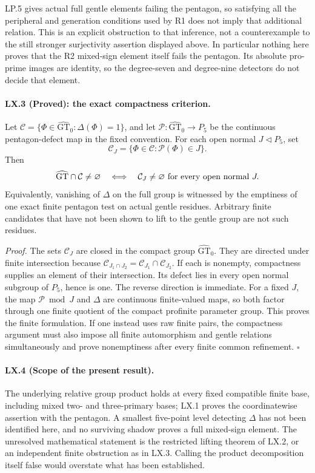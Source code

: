 LP.5 gives actual full gentle elements failing the pentagon,
so satisfying all the peripheral and generation conditions
used by R1 does not imply that additional relation. This is
an explicit obstruction to that inference, not a counterexample
to the still stronger surjectivity assertion displayed above.
In particular nothing here proves that the R2 mixed-sign
element itself fails the pentagon. Its absolute pro-prime
images are identity, so the degree-seven and degree-nine
detectors do not decide that element.

\paragraph{LX.3 (Proved): the exact compactness criterion.}
Let $\mathcal C=\{\Phi\in\widehat{\mathrm{GT}}_0:
\Delta(\Phi)=1\}$, and let
$\mathcal P:\widehat{\mathrm{GT}}_0\to P_5$ be the continuous
pentagon-defect map in the fixed convention. For each open
normal $J\triangleleft P_5$, set
\[
 \mathcal C_J=
 \{\Phi\in\mathcal C:\mathcal P(\Phi)\in J\}.
\]
Then
\[
 \widehat{\mathrm{GT}}\cap\mathcal C\ne\varnothing
 \quad\Longleftrightarrow\quad
 \mathcal C_J\ne\varnothing\ \hbox{for every open normal }J.
\]
Equivalently, vanishing of $\Delta$ on the full group is
witnessed by the emptiness of one exact finite pentagon test
on actual gentle residues. Arbitrary finite candidates that
have not been shown to lift to the gentle group are not such
residues.

\emph{Proof.}
The sets $\mathcal C_J$ are closed in the compact group
$\widehat{\mathrm{GT}}_0$. They are directed under finite
intersection because
$\mathcal C_{J_1\cap J_2}=\mathcal C_{J_1}\cap\mathcal C_{J_2}$.
If each is nonempty, compactness supplies an element of their
intersection. Its defect lies in every open normal subgroup
of $P_5$, hence is one. The reverse direction is immediate.
For a fixed $J$, the map $\mathcal P\bmod J$ and $\Delta$
are continuous finite-valued maps, so both factor through
one finite quotient of the compact profinite parameter group.
This proves the finite formulation. If one instead uses raw
finite pairs, the compactness argument must also impose all
finite automorphism and gentle relations simultaneously and
prove nonemptiness after every finite common refinement.
\hfill$\square$

\paragraph{LX.4 (Scope of the present result).}
The underlying relative group product holds at every fixed
compatible finite base, including mixed two- and three-primary
bases; LX.1 proves the coordinatewise assertion with the
pentagon. A smallest five-point level detecting $\Delta$ has
not been identified here, and no surviving shadow proves a
full mixed-sign element. The unresolved mathematical statement
is the restricted lifting theorem of LX.2, or an independent
finite obstruction as in LX.3. Calling the product decomposition
itself false would overstate what has been established.
